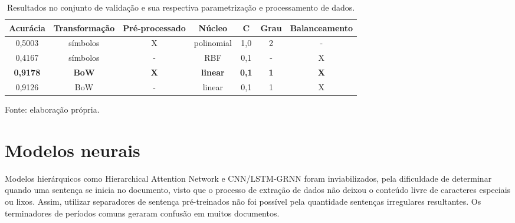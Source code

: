 \begin{table}[ht]
    \centering
    \caption[Resultados e parâmetros do SVM]{Resultados no conjunto de validação e sua respectiva parametrização e processamento de dados.}
    \label{tab:svmParametros}
    \begin{tabular}{|c|c|c|c|c|c|c|}
        \hline 
        Acurácia & Transformação & Pré-processado & Núcleo & C & Grau & Balanceamento\protect\footnotemark \\
        \hline 
        0,5003 & símbolos & X & polinomial & 1,0 & 2 & - \\
        \hline 
        0,4167 & símbolos & - & RBF & 0,1 & - & X \\
        \hline 
        \textbf{0,9178} & \textbf{BoW} & \textbf{X} & \textbf{linear} & \textbf{0,1} & \textbf{1} & \textbf{X} \\
        \hline 
        0,9126 & BoW & - & linear & 0,1 & 1 & X \\
        \hline
    \end{tabular}\par Fonte: elaboração própria.
\end{table}


\section{Modelos neurais}

Modelos hierárquicos como Hierarchical Attention Network  \cite{yang_hierarchical_2016} e CNN/LSTM-GRNN \cite{tang_document_2015} foram inviabilizados, pela dificuldade de determinar quando uma sentença se inicia no documento, visto que o processo de extração de dados não deixou o conteúdo livre de caracteres especiais ou lixos. Assim, utilizar separadores de sentença pré-treinados não foi possível pela quantidade sentenças irregulares resultantes. Os terminadores de períodos comuns geraram confusão em muitos documentos.


